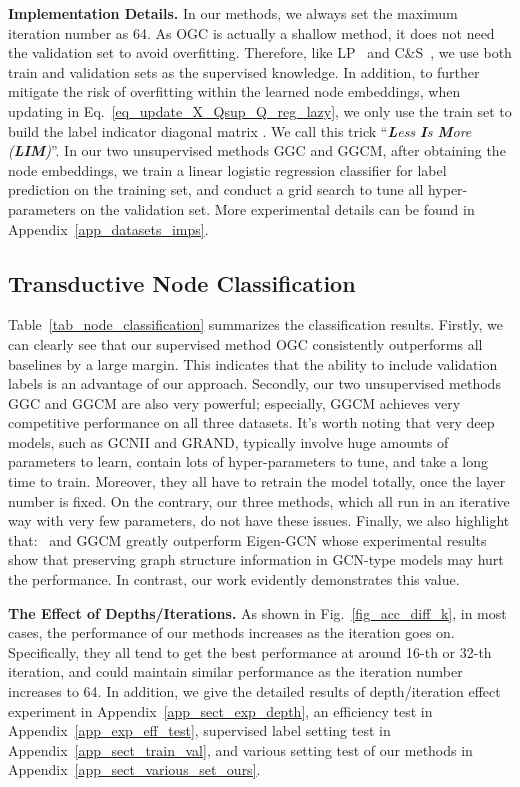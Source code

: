 \textbf{Implementation Details.}
In our methods, we always set the maximum iteration number as 64.
As OGC is actually a shallow method, it does not need the validation set to avoid overfitting.
Therefore, like LP~\citep{zhu_2003_icml} and C\&S~\citep{huang2020combining}, we use both train and validation sets as the supervised knowledge.
In addition, to further mitigate the risk of overfitting within the learned node embeddings, when updating  in Eq.~\ref{eq_update_X_Qsup_Q_reg_lazy}, we only use the train set to build the label indicator diagonal matrix .
We call this trick ``\emph{\textbf{L}ess \textbf{I}s \textbf{M}ore (\textbf{LIM})}''.
In our two unsupervised methods GGC and GGCM, after obtaining the node embeddings, we train a linear logistic regression classifier for label prediction on the training set, and conduct a grid search to tune all hyper-parameters on the validation set.
More experimental details can be found in Appendix~\ref{app_datasets_imps}.


\vspace{-5pt}
\subsection{Transductive Node Classification}\label{sub_sect_node_clf}
\vspace{-5pt}
Table~\ref{tab_node_classification} summarizes the classification results.
Firstly, we can clearly see that our supervised method OGC consistently outperforms all baselines by a large margin.
This indicates that the ability to include validation labels is an advantage of our approach.
Secondly, our two unsupervised methods GGC and GGCM are also very powerful; especially, GGCM achieves very competitive performance on all three datasets.
It's worth noting that very deep models, such as GCNII and GRAND, typically involve huge amounts of parameters to learn, contain lots of hyper-parameters to tune, and take a long time to train.
Moreover, they all have to retrain the model totally, once the layer number is fixed.
On the contrary, our three methods, which all run in an iterative way with very few parameters, do not have these issues.
Finally, we also highlight that: \mygspalg\ and GGCM greatly outperform Eigen-GCN whose experimental results show that preserving graph structure information in GCN-type models may hurt the performance.
In contrast, our work evidently demonstrates this value.



\textbf{The Effect of Depths/Iterations.}
As shown in Fig.~\ref{fig_acc_diff_k}, in most cases, the performance of our methods increases as the iteration goes on.
Specifically, they all tend to get the best performance at around 16-th or 32-th iteration, and could maintain similar performance as the iteration number increases to 64.
In addition, we give the detailed results of depth/iteration effect experiment in Appendix~\ref{app_sect_exp_depth}, an efficiency test in Appendix~\ref{app_exp_eff_test}, supervised label setting test in Appendix~\ref{app_sect_train_val}, and various setting test of our methods in Appendix~\ref{app_sect_various_set_ours}.


